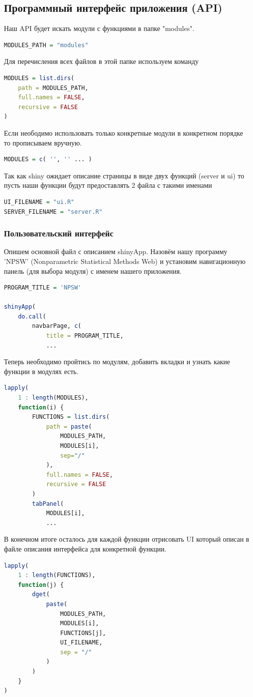 \documentclass[14pt,a4paper]{scrartcl}
\begin{document}
    \subsection[Программный интерфейс приложения]{Программный интерфейс приложения (API)}
    Наш API будет искать модули с функциями в папке "modules".
    \begin{lstlisting}[language=R]
MODULES_PATH = "modules"
    \end{lstlisting}
    Для перечисления всех файлов в этой папке используем команду
    \begin{lstlisting}[language=R]
MODULES = list.dirs(
    path = MODULES_PATH,
    full.names = FALSE,
    recursive = FALSE
)
    \end{lstlisting}
    Если неободимо использовать только конкретные модули в конкретном порядке то прописываем вручную.
    \begin{lstlisting}[language=R]
MODULES = c( '', '' ... )
    \end{lstlisting}
    Так как shiny ожидает описание страницы в виде двух функций (server и ui) то пусть наши функции будут предоставлять 2 файла с такими именами
    \begin{lstlisting}[language=R]
UI_FILENAME = "ui.R"
SERVER_FILENAME = "server.R"
    \end{lstlisting}

    \subsubsection[Пользовательский интерфейс]{Пользовательский интерфейс}
    Опишем основной файл с описанием shinyApp. Назовём нашу программу 'NPSW' (Nonparametric Statistical Methods Web) и установим навигационную панель (для выбора модуля) с именем нашего приложения.
    \begin{lstlisting}[language=R]
PROGRAM_TITLE = 'NPSW'

shinyApp(
    do.call(
        navbarPage, c(
            title = PROGRAM_TITLE,
            ...
    \end{lstlisting}
    Теперь необходимо пройтись по модулям, добавить вкладки и узнать какие функции в модулях есть.
    \begin{lstlisting}[language=R]
lapply(
    1 : length(MODULES),
    function(i) {
        FUNCTIONS = list.dirs(
            path = paste(
                MODULES_PATH,
                MODULES[i],
                sep="/"
            ),
            full.names = FALSE,
            recursive = FALSE
        )
        tabPanel(
            MODULES[i],
            ...
    \end{lstlisting}
    В конечном итоге осталось для каждой функции отрисовать UI который описан в файле описания интерфейса для конкретной функции.
    \begin{lstlisting}[language=R]
lapply(
    1 : length(FUNCTIONS),
    function(j) {
        dget(
            paste(
                MODULES_PATH,
                MODULES[i],
                FUNCTIONS[j],
                UI_FILENAME,
                sep = "/"
            )
        )
    }
)
    \end{lstlisting}
\end{document}
